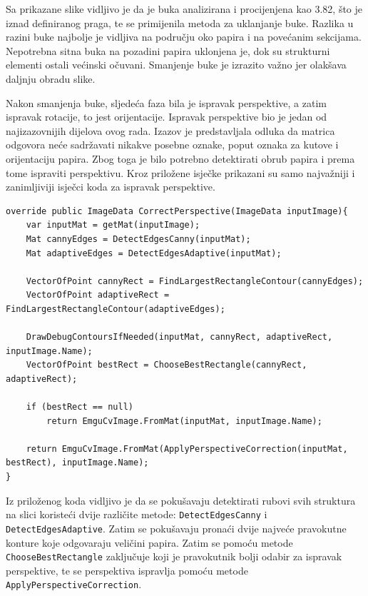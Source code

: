 \documentclass{foi}
\begin{document}
Sa prikazane slike vidljivo je da je buka analizirana i procijenjena kao 3.82, što je iznad definiranog praga, te se primijenila metoda za uklanjanje buke. Razlika u razini buke najbolje je vidljiva na području oko papira i na povećanim sekcijama. Nepotrebna sitna buka na pozadini papira uklonjena je, dok su strukturni elementi ostali većinski očuvani. Smanjenje buke je izrazito važno jer olakšava daljnju obradu slike.

Nakon smanjenja buke, sljedeća faza bila je ispravak perspektive, a zatim ispravak rotacije, to jest orijentacije. Ispravak perspektive bio je jedan od najizazovnijih dijelova ovog rada. Izazov je predstavljala odluka da matrica odgovora neće sadržavati nikakve posebne oznake, poput oznaka za kutove i orijentaciju papira. Zbog toga je bilo potrebno detektirati obrub papira i prema tome ispraviti perspektivu. Kroz priložene isječke prikazani su samo najvažniji i zanimljiviji isječci koda za ispravak perspektive.  

\begin{lstlisting}[caption={Metoda za ispravak perspektive slike}]
override public ImageData CorrectPerspective(ImageData inputImage){
    var inputMat = getMat(inputImage);
    Mat cannyEdges = DetectEdgesCanny(inputMat);
    Mat adaptiveEdges = DetectEdgesAdaptive(inputMat);

    VectorOfPoint cannyRect = FindLargestRectangleContour(cannyEdges);
    VectorOfPoint adaptiveRect = FindLargestRectangleContour(adaptiveEdges);

    DrawDebugContoursIfNeeded(inputMat, cannyRect, adaptiveRect, inputImage.Name);
    VectorOfPoint bestRect = ChooseBestRectangle(cannyRect, adaptiveRect);

    if (bestRect == null)
        return EmguCvImage.FromMat(inputMat, inputImage.Name);

    return EmguCvImage.FromMat(ApplyPerspectiveCorrection(inputMat, bestRect), inputImage.Name);
}
\end{lstlisting}

Iz priloženog koda vidljivo je da se pokušavaju detektirati rubovi svih struktura na slici koristeći dvije različite metode: \texttt{DetectEdgesCanny} i \texttt{DetectEdgesAdaptive}. Zatim se pokušavaju pronaći dvije najveće pravokutne konture koje odgovaraju veličini papira. Zatim se pomoću metode \texttt{ChooseBestRectangle} zaključuje koji je pravokutnik bolji odabir za ispravak perspektive, te se perspektiva ispravlja pomoću metode \texttt{ApplyPerspectiveCorrection}.
\end{document}
